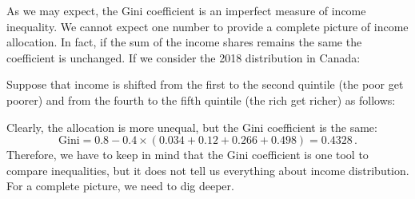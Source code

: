 \documentclass[letterpaper]{article}\usepackage[]{graphicx}\usepackage[]{color}
\numberwithin{exer}{section}
\theoremstyle{nonumberplain}
\begin{document}
As we may expect, the Gini coefficient is an imperfect measure of
income inequality. We cannot expect one number to provide a complete
picture of income allocation. In fact, if the sum of the income shares
remains the same the coefficient is unchanged. If we consider the 2018
distribution in Canada:
\begin{center}
\end{center} 
Suppose that income is shifted from the first to the second quintile
(the poor get poorer) and from the fourth to the fifth quintile (the
rich get richer) as follows:
\begin{center}
\end{center}
Clearly, the allocation is more unequal, but the Gini coefficient is
the same:
\[
\mbox{Gini} = 0.8 - 0.4\times
(0.034+0.12+0.266+0.498) = 0.4328\,.
\]
Therefore, we have to keep in mind that the Gini coefficient is one
tool to compare inequalities, but it does not tell us everything about
income distribution. For a complete picture, we need to dig deeper.
\end{document}
